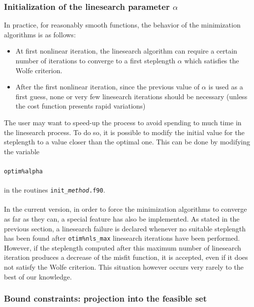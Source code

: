 \documentclass[a4paper,twoside,final,onecolumn,11pt,openright]{article}
\begin{document}
\subsubsection{Initialization of the linesearch parameter $\alpha$}
In practice, for reasonably smooth functions, the behavior of the minimization algorithms is as follows:
\begin{itemize}
 \item At first nonlinear iteration, the linesearch algorithm can require a certain number of iterations to converge to a first steplength $\alpha$ which satisfies the Wolfe criterion.
 \item After the first nonlinear iteration, since the previous value of $\alpha$ is used as a first guess, none or very few linesearch iterations should be necessary (unless the cost function presents rapid variations) 
\end{itemize}
The user may want to speed-up the process to avoid spending to much time in the linesearch process. To do so, it is possible to modify the initial value for the steplength to a value closer than the optimal one. This can be done by modifying the variable
\\
\\
\texttt{optim\%alpha} 
\\
\\
in the routines \texttt{init\_\textit{method}.f90}.
\\
\\
\indent In the current version, in order to force the minimization algorithms to converge as far as they can, a special feature has also be implemented. As stated in the previous section, a linesearch failure is declared whenever no suitable steplength has been found after \texttt{otim\%nls\_max} linesearch iterations have been performed. However, if the steplength computed after this maximum number of linesearch iteration produces a decrease of the misfit function, it is accepted, even if it does not satisfy the Wolfe criterion. This situation however occurs very rarely to the best of our knowledge. 

\subsubsection{Bound constraints: projection into the feasible set}
\end{document}
